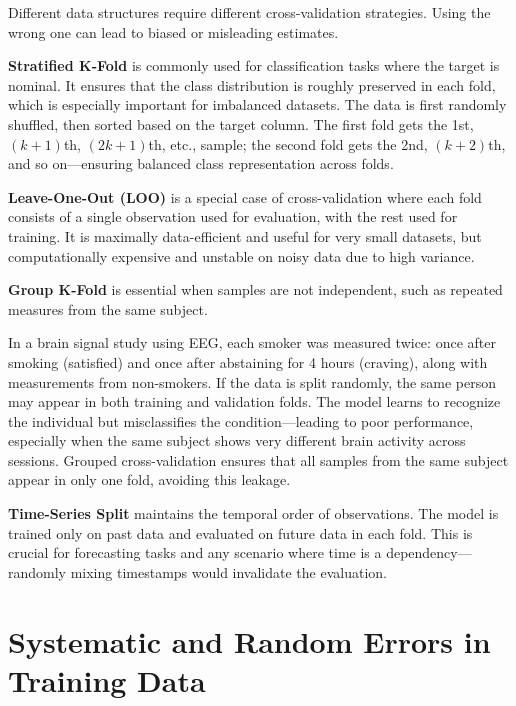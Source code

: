 \documentclass[12pt,openany, draft]{book}
\begin{document}
Different data structures require different cross-validation strategies. Using the wrong one can lead to biased or misleading estimates. \newline

\textbf{Stratified K-Fold} is commonly used for classification tasks where the target is nominal. It ensures that the class distribution is roughly preserved in each fold, which is especially important for imbalanced datasets. The data is first randomly shuffled, then sorted based on the target column. The first fold gets the 1st, $(k+1)$th, $(2k+1)$th, etc., sample; the second fold gets the 2nd, $(k+2)$th, and so on—ensuring balanced class representation across folds. \newline

\textbf{Leave-One-Out (LOO)} is a special case of cross-validation where each fold consists of a single observation used for evaluation, with the rest used for training. It is maximally data-efficient and useful for very small datasets, but computationally expensive and unstable on noisy data due to high variance. \newline

\textbf{Group K-Fold} is essential when samples are not independent, such as repeated measures from the same subject.

\begin{examplebox}
In a brain signal study using EEG, each smoker was measured twice: once after smoking (satisfied) and once after abstaining for 4 hours (craving), along with measurements from non-smokers. If the data is split randomly, the same person may appear in both training and validation folds. The model learns to recognize the individual but misclassifies the condition—leading to poor performance, especially when the same subject shows very different brain activity across sessions. Grouped cross-validation ensures that all samples from the same subject appear in only one fold, avoiding this leakage.
\end{examplebox}

\textbf{Time-Series Split} maintains the temporal order of observations. The model is trained only on past data and evaluated on future data in each fold. This is crucial for forecasting tasks and any scenario where time is a dependency—randomly mixing timestamps would invalidate the evaluation.




\section{Systematic and Random Errors in Training Data}
\end{document}
